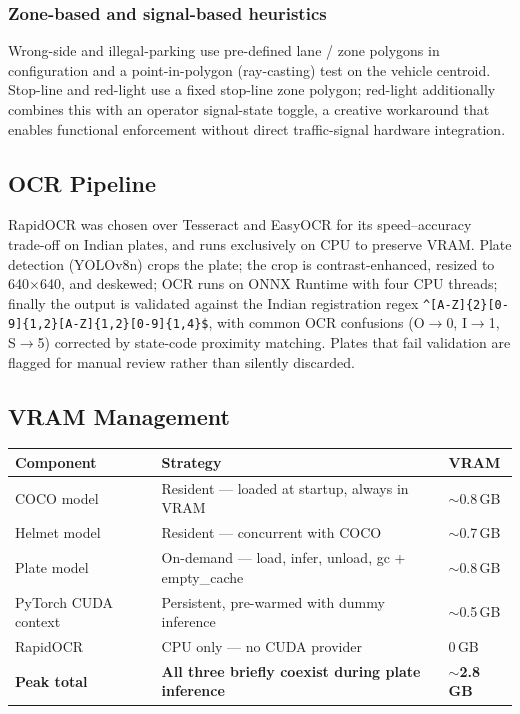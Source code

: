 \documentclass[11pt,a4paper]{article}
\begin{document}
\subsubsection{Zone-based and signal-based heuristics}
Wrong-side and illegal-parking use pre-defined lane / zone polygons in configuration and a point-in-polygon (ray-casting) test on the vehicle centroid. Stop-line and red-light use a fixed stop-line zone polygon; red-light additionally combines this with an operator signal-state toggle, a creative workaround that enables functional enforcement without direct traffic-signal hardware integration.

\subsection{OCR Pipeline}

RapidOCR was chosen over Tesseract and EasyOCR for its speed–accuracy trade-off on Indian plates, and runs exclusively on CPU to preserve VRAM. Plate detection (YOLOv8n) crops the plate; the crop is contrast-enhanced, resized to 640$\times$640, and deskewed; OCR runs on ONNX Runtime with four CPU threads; finally the output is validated against the Indian registration regex \verb|^[A-Z]{2}[0-9]{1,2}[A-Z]{1,2}[0-9]{1,4}$|, with common OCR confusions (O$\rightarrow$0, I$\rightarrow$1, S$\rightarrow$5) corrected by state-code proximity matching. Plates that fail validation are flagged for manual review rather than silently discarded.

\subsection{VRAM Management}

\begin{longtable}{@{}p{3.6cm}p{7cm}p{1.8cm}@{}}
\hline
\textbf{Component} & \textbf{Strategy} & \textbf{VRAM} \\
\hline
COCO model & Resident — loaded at startup, always in VRAM & $\sim$0.8\,GB \\
Helmet model & Resident — concurrent with COCO & $\sim$0.7\,GB \\
Plate model & On-demand — load, infer, unload, gc + empty\_cache & $\sim$0.8\,GB \\
PyTorch CUDA context & Persistent, pre-warmed with dummy inference & $\sim$0.5\,GB \\
RapidOCR & CPU only — no CUDA provider & 0\,GB \\
\textbf{Peak total} & \textbf{All three briefly coexist during plate inference} & \textbf{$\sim$2.8\,GB} \\
\hline
\end{longtable}
\end{document}
